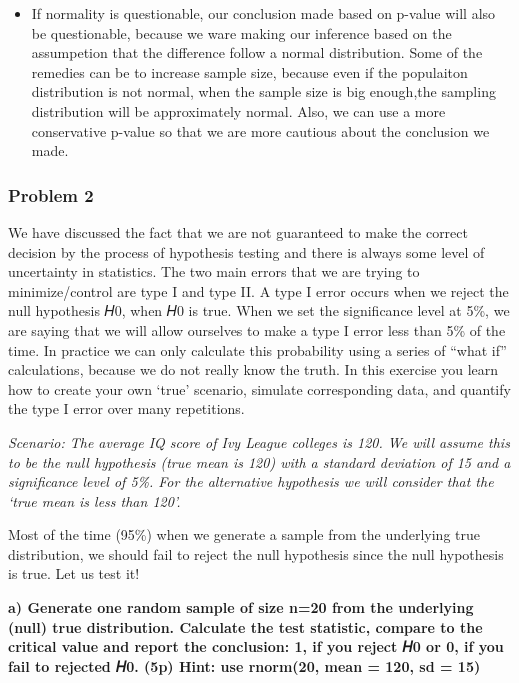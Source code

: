 \documentclass[]{article}
\providecommand{\tightlist}{%
  \setlength{\itemsep}{0pt}\setlength{\parskip}{0pt}}
\begin{document}
\begin{itemize}
\tightlist
\item
  If normality is questionable, our conclusion made based on p-value
  will also be questionable, because we ware making our inference based
  on the assumpetion that the difference follow a normal distribution.
  Some of the remedies can be to increase sample size, because even if
  the populaiton distribution is not normal, when the sample size is big
  enough,the sampling distribution will be approximately normal. Also,
  we can use a more conservative p-value so that we are more cautious
  about the conclusion we made.
\end{itemize}

\hypertarget{problem-2}{%
\subsubsection{Problem 2}\label{problem-2}}

We have discussed the fact that we are not guaranteed to make the
correct decision by the process of hypothesis testing and there is
always some level of uncertainty in statistics. The two main errors that
we are trying to minimize/control are type I and type II. A type I error
occurs when we reject the null hypothesis 𝐻0, when 𝐻0 is true. When we
set the significance level at 5\%, we are saying that we will allow
ourselves to make a type I error less than 5\% of the time. In practice
we can only calculate this probability using a series of ``what if''
calculations, because we do not really know the truth. In this exercise
you learn how to create your own `true' scenario, simulate corresponding
data, and quantify the type I error over many repetitions.

\emph{Scenario: The average IQ score of Ivy League colleges is 120. We
will assume this to be the null hypothesis (true mean is 120) with a
standard deviation of 15 and a significance level of 5\%. For the
alternative hypothesis we will consider that the `true mean is less than
120'.}

Most of the time (95\%) when we generate a sample from the underlying
true distribution, we should fail to reject the null hypothesis since
the null hypothesis is true. Let us test it!

\textbf{a) Generate one random sample of size n=20 from the underlying
(null) true distribution. Calculate the test statistic, compare to the
critical value and report the conclusion: 1, if you reject 𝐻0 or 0, if
you fail to rejected 𝐻0. (5p) Hint: use rnorm(20, mean = 120, sd = 15)}
\end{document}

